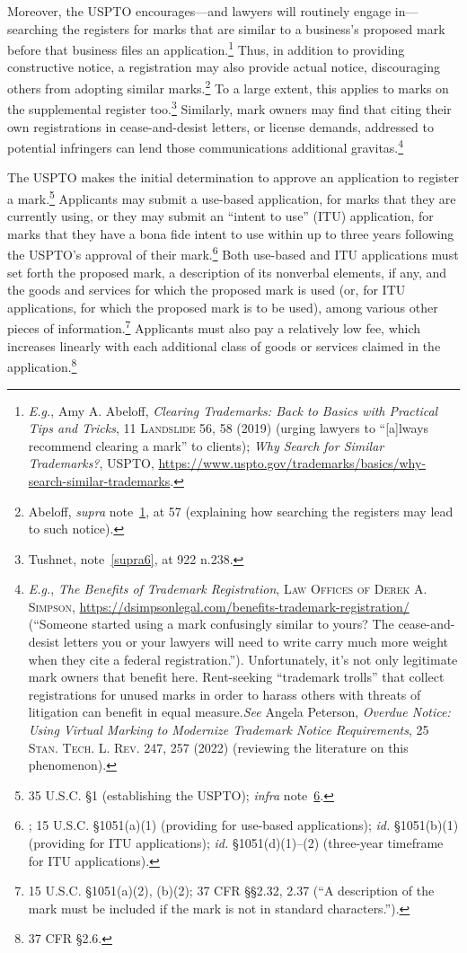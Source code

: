 \documentclass[letterpaper, 11pt, oneside]{article}
\begin{document}
Moreover, the USPTO encourages—and lawyers will routinely engage in—searching the registers for marks that are similar to a business's proposed mark before that business files an application.\footnote{\label{supra9} \textit{E.g.}, Amy A. Abeloff, \textit{Clearing Trademarks: Back to Basics with Practical Tips and Tricks}, 11 \textsc{Landslide} 56, 58 (2019) (urging lawyers to ``[a]lways recommend clearing a mark'' to clients); \textit{Why Search for Similar Trademarks?}, USPTO, \url{https://www.uspto.gov/trademarks/basics/why-search-similar-trademarks}.} Thus, in addition to providing constructive notice, a registration may also provide actual notice, discouraging others from adopting similar marks.\footnote{Abeloff, \textit{supra} note~\ref{supra9}, at 57 (explaining how searching the registers may lead to such notice).} To a large extent, this applies to marks on the supplemental register too.\footnote{Tushnet, note~\ref{supra6}, at 922 n.238.} Similarly, mark owners may find that citing their own registrations in cease-and-desist letters, or license demands, addressed to potential infringers can lend those communications additional gravitas.\footnote{\textit{E.g.}, \textit{The Benefits of Trademark Registration}, \textsc{Law Offices of Derek A. Simpson}, \url{https://dsimpsonlegal.com/benefits-trademark-registration/} (``Someone started using a mark confusingly similar to yours? The cease-and-desist letters you or your lawyers will need to write carry much more weight when they cite a federal registration.''). Unfortunately, it's not only legitimate mark owners that benefit here. Rent-seeking ``trademark trolls'' that collect registrations for unused marks in order to harass others with threats of litigation can benefit in equal measure.\textit{See} Angela Peterson, \textit{Overdue Notice: Using Virtual Marking to Modernize Trademark Notice Requirements}, 25 \textsc{Stan. Tech. L. Rev.} 247, 257 (2022) (reviewing the literature on this phenomenon).}

The USPTO makes the initial determination to approve an application to register a mark.\footnote{35 U.S.C. \S 1 (establishing the USPTO); \textit{infra} note~\ref{infra1}.} Applicants may submit a use-based application, for marks that they are currently using, or they may submit an ``intent to use'' (ITU) application, for marks that they have a bona fide intent to use within up to three years following the USPTO's approval of their mark.\footnote{\label{infra1}; 15 U.S.C. \S 1051(a)(1) (providing for use-based applications); \textit{id.} \S 1051(b)(1) (providing for ITU applications); \textit{id.} \S 1051(d)(1)–(2) (three-year timeframe for ITU applications).} Both use-based and ITU applications must set forth the proposed mark, a description of its nonverbal elements, if any, and the goods and services for which the proposed mark is used (or, for ITU applications, for which the proposed mark is to be used), among various other pieces of information.\footnote{15 U.S.C. \S 1051(a)(2), (b)(2); 37 CFR \S\S 2.32, 2.37 (``A description of the mark must be included if the mark is not in standard characters.'').} Applicants must also pay a relatively low fee, which increases linearly with each additional class of goods or services claimed in the application.\footnote{37 CFR \S 2.6.}
\end{document}
